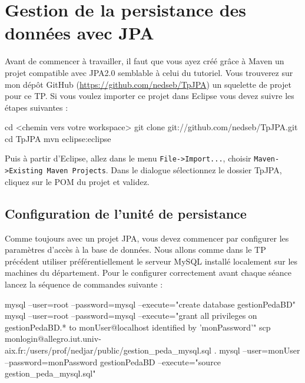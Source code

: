 \documentclass[a4paper,11pt]{article}
\begin{document}
\section{Gestion de la persistance des données avec JPA}
Avant de commencer à travailler, il faut que vous ayez créé grâce à Maven un projet compatible avec JPA2.0 semblable à 
celui du tutoriel. Vous trouverez sur mon dépôt GitHub (\url{https://github.com/nedseb/TpJPA}) un squelette de projet 
pour ce TP. Si vous voulez importer ce projet dans Eclipse vous devez suivre les étapes suivantes : 
\begin{code_shell}
cd <chemin vers votre workspace>
git clone git://github.com/nedseb/TpJPA.git
cd TpJPA
mvn eclipse:eclipse
\end{code_shell}
Puis à partir d'Eclipse, allez dans le menu \texttt{File->Import...}, choisir \texttt{Maven->Existing Maven Projects}.
Dans le dialogue sélectionnez le dossier TpJPA, cliquez sur le POM du projet et validez. 

\subsection{Configuration de l'unité de persistance}
Comme toujours avec un projet JPA, vous devez commencer par configurer les paramètres d'accès à la base de données.
Nous allons comme dans le TP précédent utiliser préférentiellement le serveur MySQL installé localement sur les machines 
du département. Pour le configurer correctement avant chaque séance lancez la séquence de commandes suivante :
\begin{code_shell}
mysql --user=root --password=mysql --execute="create database gestionPedaBD"
mysql --user=root --password=mysql --execute="grant all privileges on gestionPedaBD.* to monUser@localhost identified by 'monPassword'"
scp monlogin@allegro.iut.univ-aix.fr:/users/prof/nedjar/public/gestion_peda_mysql.sql .
mysql --user=monUser --password=monPassword gestionPedaBD --execute="source gestion_peda_mysql.sql"
\end{code_shell}
\end{document}
